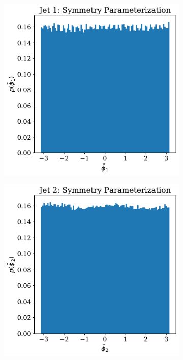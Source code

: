 \begin{figure}
\begin{subfigure}[b]{0.45\textwidth}
        \caption{}
        \label{fig:KLrand_ii}
    \end{subfigure}
\\
    \begin{subfigure}[b]{0.45\textwidth}
        \centering
        \includegraphics[width=\textwidth]{figures/chapter-09/KL_symm1.pdf}
        \caption{}
        \label{fig:KLsymm_i}
    \end{subfigure}
    \hfill
    \begin{subfigure}[b]{0.45\textwidth}
        \centering
        \includegraphics[width=\textwidth]{figures/chapter-09/KL_symm2.pdf}

\end{subfigure}
\end{figure}
